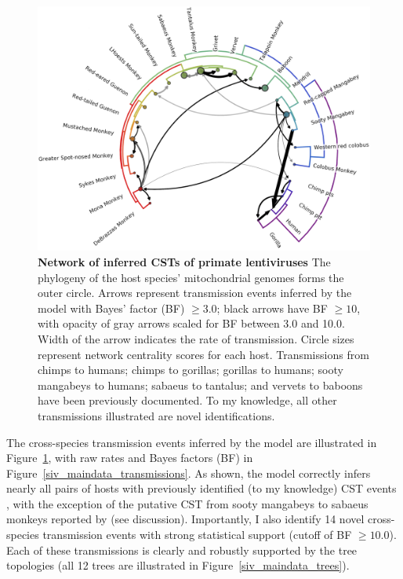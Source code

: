 \begin{figure}[h!]
  \begin{centering}
    \includegraphics[width=.7\linewidth]{./png/siv_cst.png}
  	\caption[Network of inferred CSTs of primate lentiviruses]{\textbf{Network of inferred CSTs of primate lentiviruses }
The phylogeny of the host species' mitochondrial genomes forms the outer circle.
Arrows represent transmission events inferred by the model with Bayes' factor (BF) $\geq 3.0$; black arrows have BF $\geq 10$, with opacity of gray arrows scaled for BF between 3.0 and 10.0.
Width of the arrow indicates the rate of transmission.
Circle sizes represent network centrality scores for each host.
Transmissions from chimps to humans; chimps to gorillas; gorillas to humans; sooty mangabeys to humans; sabaeus to tantalus; and vervets to baboons have been previously documented.
To my knowledge, all other transmissions illustrated are novel identifications.
    }
  	\label{siv_cst}
  \end{centering}
\end{figure}

The cross-species transmission events inferred by the model are illustrated in Figure~\ref{siv_cst}, with raw rates and Bayes factors (BF) in Figure~\ref{siv_maindata_transmissions}.
As shown, the model correctly infers nearly all pairs of hosts with previously identified (to my knowledge) CST events \citep{bailes2003hybrid,d2015origin,gao1992human,gao1999origin,jin1994infection,leitner2007sequence}, with the exception of the putative CST from sooty mangabeys to sabaeus monkeys reported by \citep{jin1994mosaic} (see discussion).
Importantly, I also identify 14 novel cross-species transmission events with strong statistical support (cutoff of BF $\geq 10.0$).
Each of these transmissions is clearly and robustly supported by the tree topologies (all 12 trees are illustrated in Figure~\ref{siv_maindata_trees}).

